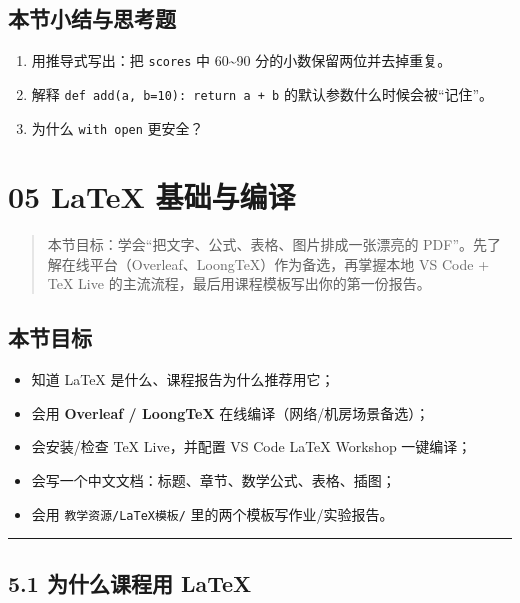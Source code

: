 \subsection{本节小结与思考题}\label{ux672cux8282ux5c0fux7ed3ux4e0eux601dux8003ux9898-2}

\begin{enumerate}
\def\labelenumi{\arabic{enumi}.}
\tightlist
\item
  用推导式写出：把 \texttt{scores} 中 60\textasciitilde90
  分的小数保留两位并去掉重复。
\item
  解释 \texttt{def\ add(a,\ b=10):\ return\ a\ +\ b}
  的默认参数什么时候会被``记住''。
\item
  为什么 \texttt{with\ open} 更安全？
\end{enumerate}

\section{05 LaTeX
基础与编译}\label{latex-ux57faux7840ux4e0eux7f16ux8bd1}

\begin{quote}
本节目标：学会``把文字、公式、表格、图片排成一张漂亮的
PDF''。先了解在线平台（Overleaf、LoongTeX）作为备选，再掌握本地 VS Code
+ TeX Live 的主流流程，最后用课程模板写出你的第一份报告。
\end{quote}

\subsection{本节目标}\label{ux672cux8282ux76eeux6807-4}

\begin{itemize}
\tightlist
\item
  知道 LaTeX 是什么、课程报告为什么推荐用它；
\item
  会用 \textbf{Overleaf / LoongTeX} 在线编译（网络/机房场景备选）；
\item
  会安装/检查 TeX Live，并配置 VS Code LaTeX Workshop 一键编译；
\item
  会写一个中文文档：标题、章节、数学公式、表格、插图；
\item
  会用 \texttt{教学资源/LaTeX模板/} 里的两个模板写作业/实验报告。
\end{itemize}

\begin{center}\rule{0.5\linewidth}{0.5pt}\end{center}

\subsection{5.1 为什么课程用
LaTeX}\label{ux4e3aux4ec0ux4e48ux8bfeux7a0bux7528-latex}

